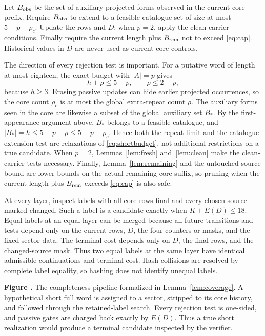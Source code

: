 \documentclass[11pt]{article}
\newcommand{\prooffigure}[3]{%
  \begin{center}
  \begin{minipage}{.98\linewidth}
  \centering
  \resizebox{\linewidth}{!}{}\par
  \refstepcounter{figure}\label{#2}%
  \small\textbf{Figure \thefigure.} #3
  \end{minipage}
  \end{center}}
\begin{document}
Let $B_{\rm obs}$ be the set of auxiliary projected forms observed in the
current core prefix. Require $B_{\rm obs}$ to extend to a feasible
catalogue set of size at most $5-p-\rho_c$. Update the rows and $D$; when
$p=2$, apply the clean-carrier conditions. Finally require the current
length plus $B_{\rm rem}$ not to exceed \eqref{eq:cap}.
Historical values in $D$ are never used as current core controls.

The direction of every rejection test is important. For a putative word of
length at most eighteen, the exact budget with $|A|=p$ gives
\begin{equation}\label{eq:shortbudget}
h+\rho\le5-p,\qquad \rho\le2-p,
\end{equation}
because $h\ge3$. Erasing passive updates can hide earlier projected
occurrences, so the core count $\rho_c$ is at most the global extra-repeat
count $\rho$. The auxiliary forms seen in the core are likewise a subset of
the global auxiliary set $B_*$. By the first-appearance argument above, $B_*$
belongs to a feasible catalogue, and
$|B_*|=h\le5-p-\rho\le5-p-\rho_c$. Hence both the repeat limit and the catalogue
extension test are relaxations of \eqref{eq:shortbudget}, not additional
restrictions on a true candidate. When $p=2$, Lemmas~\ref{lem:fresh}
and~\ref{lem:clean} make the clean-carrier tests necessary. Finally,
Lemma~\ref{lem:remaining} and the untouched-source bound are lower bounds on
the actual remaining core suffix, so pruning when the current length plus
$B_{\rm rem}$ exceeds \eqref{eq:cap} is also safe.

At every layer, inspect labels with all core rows final and every
chosen source marked changed. Such a label is a candidate exactly when
$K+E(D)\le18$. Equal labels at an equal layer can be merged because all
future transitions and tests depend only on the current rows, $D$, the four
counters or masks, and the fixed sector data. The terminal cost depends only
on $D$, the final rows, and the changed-source mask. Thus two equal labels at
the same layer have identical admissible continuations and terminal cost.
Hash collisions are resolved by complete label equality, so hashing does not
identify unequal labels.
\prooffigure{search_coverage}{fig:search-coverage}{The completeness pipeline
formalized in Lemma~\ref{lem:coverage}. A hypothetical short full word is
assigned to a sector, stripped to its core history, and followed through the
retained-label search. Every rejection test is one-sided, and passive gates
are charged back exactly by $E(D)$. Thus a true short realization would
produce a terminal candidate inspected by the verifier.}
\end{document}

